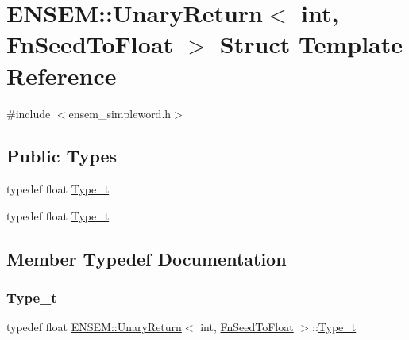 \hypertarget{structENSEM_1_1UnaryReturn_3_01int_00_01FnSeedToFloat_01_4}{}\section{E\+N\+S\+EM\+:\+:Unary\+Return$<$ int, Fn\+Seed\+To\+Float $>$ Struct Template Reference}
\label{structENSEM_1_1UnaryReturn_3_01int_00_01FnSeedToFloat_01_4}


{\ttfamily \#include $<$ensem\+\_\+simpleword.\+h$>$}

\subsection*{Public Types}
\begin{DoxyCompactItemize}
\item 
typedef float \mbox{\hyperlink{structENSEM_1_1UnaryReturn_3_01int_00_01FnSeedToFloat_01_4_ae22c1dee5b905b38ddda98907a2eb2fd}{Type\+\_\+t}}
\item 
typedef float \mbox{\hyperlink{structENSEM_1_1UnaryReturn_3_01int_00_01FnSeedToFloat_01_4_ae22c1dee5b905b38ddda98907a2eb2fd}{Type\+\_\+t}}
\end{DoxyCompactItemize}


\subsection{Member Typedef Documentation}
\mbox{\label{structENSEM_1_1UnaryReturn_3_01int_00_01FnSeedToFloat_01_4_ae22c1dee5b905b38ddda98907a2eb2fd}} 
\subsubsection{\texorpdfstring{Type\_t}{Type\_t}\hspace{0.1cm}{\footnotesize\ttfamily [1/2]}}
{\footnotesize\ttfamily typedef float \mbox{\hyperlink{structENSEM_1_1UnaryReturn}{E\+N\+S\+E\+M\+::\+Unary\+Return}}$<$ int, \mbox{\hyperlink{structENSEM_1_1FnSeedToFloat}{Fn\+Seed\+To\+Float}} $>$\+::\mbox{\hyperlink{structENSEM_1_1UnaryReturn_3_01int_00_01FnSeedToFloat_01_4_ae22c1dee5b905b38ddda98907a2eb2fd}{Type\+\_\+t}}}

